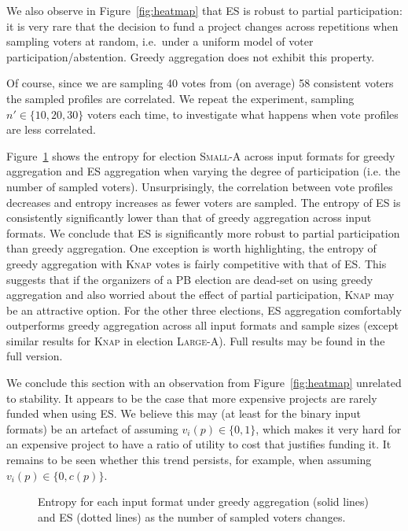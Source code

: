 \documentclass[twoside,11pt]{article}
\newcommand{\kibitz}[2]{\ifnum\Comments=1{\color{#1}{#2}}\fi}
\newcommand{\rf}[1]{\kibitz{blue}{[Roy says:#1]}}
\newcommand{\gb}[1]{\kibitz{red}{[GB:#1]}}
\newcommand{\knap}{\textsc{Knap}}
\newcommand{\mes}{ES}
\begin{document}
We also observe in   Figure~\ref{fig:heatmap} that \mes{} is robust to partial participation: it is very rare that the decision to fund a project changes across repetitions when sampling voters at random, i.e.\ under a uniform model of voter participation/abstention. Greedy aggregation does not exhibit this property. 

Of course, since we are sampling 40 votes from (on average) 58 consistent voters the sampled profiles are correlated. We repeat the experiment, sampling $n'\in\{10,20,30\}$ voters each time, to investigate what happens when vote profiles are less correlated. 
%


Figure~\ref{fig:entropy} shows the entropy for election   \textsc{Small-A} across   input formats for greedy aggregation and  \mes{} aggregation when varying the degree of participation (i.e. the number of sampled voters). 
Unsurprisingly, the correlation between vote profiles decreases and entropy increases  as fewer voters are sampled. 
The entropy of \mes{} is consistently significantly lower than that of greedy aggregation across input formats. We conclude that \mes{} is significantly more robust to partial participation than greedy aggregation. One exception is worth highlighting, the entropy of greedy aggregation with \knap{} votes is fairly competitive with that of \mes. This suggests that if the organizers of a PB election are dead-set on using greedy aggregation and also worried about the effect of partial participation,  \knap{} may be an attractive option.  
%
For the other three elections,   \mes{} aggregation comfortably outperforms greedy aggregation across all input formats and sample sizes (except similar results for \knap{} in election \textsc{Large-A}). Full results  may be found in the full version. 



We conclude this section with an observation from  Figure~\ref{fig:heatmap} unrelated to stability. It appears to be the case that more expensive projects are rarely funded  when using \mes{}.  We believe this may (at least for the binary input formats)  be an artefact of assuming $v_i(p)\in \{0,1\}$, which makes it very hard for an expensive project to have a ratio of utility to cost that justifies funding it. It remains to be seen whether this trend persists, for example, when assuming $v_i(p)\in \{0,c(p)\}$. \gb{Todo: reword observation once we have both 0-1 and 0-cost. perhaps also include a large election here}

\begin{figure}[!h]
\begin{center}
\caption{Entropy for each input format under  greedy aggregation  (solid lines) and \mes{} (dotted lines)  as the number of sampled voters changes. \gb{Todo: similar plot for 0-cost utilities}\rf{We need to think how to do this. Putting all 4 in a graph like this will make it unreadable I think}
}\label{fig:entropy}
\end{center}
\vspace{-3mm}
\end{figure}
\end{document}
